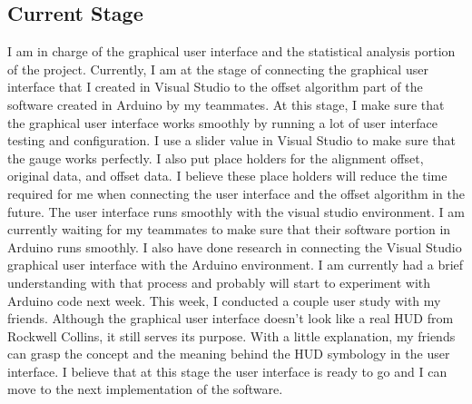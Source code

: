 \subsection{Current Stage}
I am in charge of the graphical user interface and the statistical analysis portion of the project. Currently, I am at the stage of connecting the graphical user interface that I created in Visual Studio to the offset algorithm part of the software created in Arduino by my teammates. At this stage, I make sure that the graphical user interface works smoothly by running a lot of user interface testing and configuration. I use a slider value in Visual Studio to make sure that the gauge works perfectly. I also put place holders for the alignment offset, original data, and offset data. I believe these place holders will reduce the time required for me when connecting the user interface and the offset algorithm in the future. The user interface runs smoothly with the visual studio environment. I am currently waiting for my teammates to make sure that their software portion in Arduino runs smoothly. I also have done research in connecting the Visual Studio graphical user interface with the Arduino environment. I am currently had a brief understanding with that process and probably will start to experiment with Arduino code next week. This week, I conducted a couple user study with my friends. Although the graphical user interface doesn’t look like a real HUD from Rockwell Collins, it still serves its purpose. With a little explanation, my friends can grasp the concept and the meaning behind the HUD symbology in the user interface. I believe that at this stage the user interface is ready to go and I can move to the next implementation of the software. 

